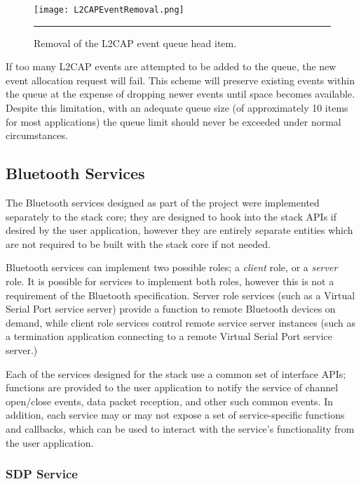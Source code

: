 \begin{figure}[tbph]
	\vspace{1em}
	\centering
		\texttt{[image: L2CAPEventRemoval.png]}
	\rule{35em}{0.5pt}
	\caption[L2CAP event object queue removal]{Removal of the L2CAP event queue head item.}
	\label{fig:l2capeventremoval}
\end{figure}

If too many L2CAP events are attempted to be added to the queue, the new event allocation request will fail. This scheme will preserve existing events within the queue at the expense of dropping newer events until space becomes available. Despite this limitation, with an adequate queue size (of approximately 10 items for most applications) the queue limit should never be exceeded under normal circumstances.

\subsection{Bluetooth Services}

The Bluetooth services designed as part of the project were implemented separately to the stack core; they are designed to hook into the stack APIs if desired by the user application, however they are entirely separate entities which are not required to be built with the stack core if not needed.

Bluetooth services can implement two possible roles; a \textit{client} role, or a \textit{server} role. It is possible for services to implement both roles, however this is not a requirement of the Bluetooth specification. Server role services (such as a Virtual Serial Port service server) provide a function to remote Bluetooth devices on demand, while client role services control remote service server instances (such as a termination application connecting to a remote Virtual Serial Port service server.)

Each of the services designed for the stack use a common set of interface APIs; functions are provided to the user application to notify the service of channel open/close events, data packet reception, and other such common events. In addition, each service may or may not expose a set of service-specific functions and callbacks, which can be used to interact with the service's functionality from the user application.

\subsubsection{SDP Service}

